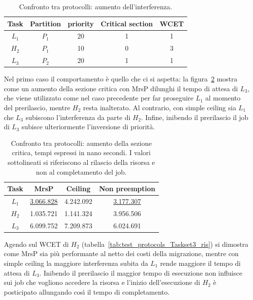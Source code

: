  \begin{table}
  \centering
  \begin{tabular}{ccccc}
  \hline\hline
    Task & Partition     & priority & Critical section & WCET  \\ \hline
    $L_1$ & $P_1$  & 20 & 1 & 1 \\
    $H_2$ & $P_1$  & 10 & 0 & 3 \\
    $L_3$ & $P_2$  & 20 & 1 & 1 \\
    \hline
    \end{tabular}
    \caption{Confronto tra protocolli: aumento dell'interferenza.}
  \label{tab:test_protocols_Taskset3}
  \end{table}

Nel primo caso il comportamento è quello che ci si aspetta: la figura~\ref{tab:test_protocols_Taskset2_ris} mostra come un aumento della sezione critica con MrsP dilunghi il tempo di attesa di $L_3$, che viene utilizzato come nel caso precedente per far proseguire $L_1$ al momento del prerilascio, mentre $H_2$ resta inalterato. Al contrario, con simple ceiling sia $L_1$ che $L_3$ subiscono l'interferenza da parte di $H_2$. Infine, inibendo il prerilascio il job di $L_3$ subisce ulteriormente l'inversione di priorità.\\

\begin{table}
  \centering
  \begin{tabular}{cccc}
  \hline\hline
    Task & MrsP & Ceiling & Non preemption \\ \hline
    $L_1$ & \underline{3.066.828} & 4.242.092 & \underline{3.177.307} \\
    $H_2$ & 1.035.721 & 1.141.324 & 3.956.506 \\
    $L_3$ & 6.099.752 & 7.209.873 & 6.024.691 \\
    \hline
    \end{tabular}
    \caption{Confronto tra protocolli: aumento della sezione critica, tempi espressi in nano secondi. I valori sottolineati si riferiscono al rilascio della risorsa e non al completamento del job.}
  \label{tab:test_protocols_Taskset2_ris}
  \end{table}

Agendo sul WCET di $H_2$ (tabella~\ref{tab:test_protocols_Taskset3_ris}) si dimostra come MrsP sia più performante al netto dei costi della migrazione, mentre con simple ceiling la maggiore interferenza subita da $L_1$ rende maggiore il tempo di attesa di $L_3$. Inibendo il prerilascio il maggior tempo di esecuzione non influisce sui job che vogliono accedere la risorsa e l'inizio dell'esecuzione di $H_2$ è posticipato allungando così il tempo di completamento.\\

